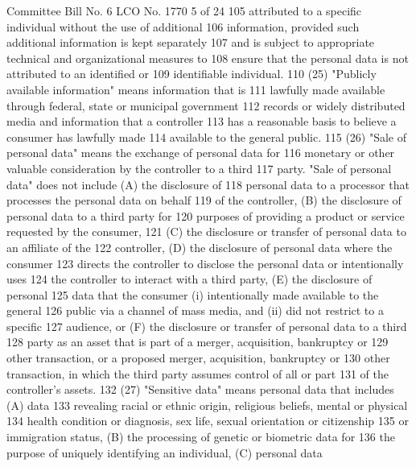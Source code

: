Committee Bill No. 6
LCO No. 1770 5 of 24
105 attributed to a specific individual without the use of additional
106 information, provided such additional information is kept separately
107 and is subject to appropriate technical and organizational measures to
108 ensure that the personal data is not attributed to an identified or
109 identifiable individual.
110 (25) "Publicly available information" means information that is
111 lawfully made available through federal, state or municipal government
112 records or widely distributed media and information that a controller
113 has a reasonable basis to believe a consumer has lawfully made
114 available to the general public.
115 (26) "Sale of personal data" means the exchange of personal data for
116 monetary or other valuable consideration by the controller to a third
117 party. "Sale of personal data" does not include (A) the disclosure of
118 personal data to a processor that processes the personal data on behalf
119 of the controller, (B) the disclosure of personal data to a third party for
120 purposes of providing a product or service requested by the consumer,
121 (C) the disclosure or transfer of personal data to an affiliate of the
122 controller, (D) the disclosure of personal data where the consumer
123 directs the controller to disclose the personal data or intentionally uses
124 the controller to interact with a third party, (E) the disclosure of personal
125 data that the consumer (i) intentionally made available to the general
126 public via a channel of mass media, and (ii) did not restrict to a specific
127 audience, or (F) the disclosure or transfer of personal data to a third
128 party as an asset that is part of a merger, acquisition, bankruptcy or
129 other transaction, or a proposed merger, acquisition, bankruptcy or
130 other transaction, in which the third party assumes control of all or part
131 of the controller's assets.
132 (27) "Sensitive data" means personal data that includes (A) data
133 revealing racial or ethnic origin, religious beliefs, mental or physical
134 health condition or diagnosis, sex life, sexual orientation or citizenship
135 or immigration status, (B) the processing of genetic or biometric data for
136 the purpose of uniquely identifying an individual, (C) personal data 

